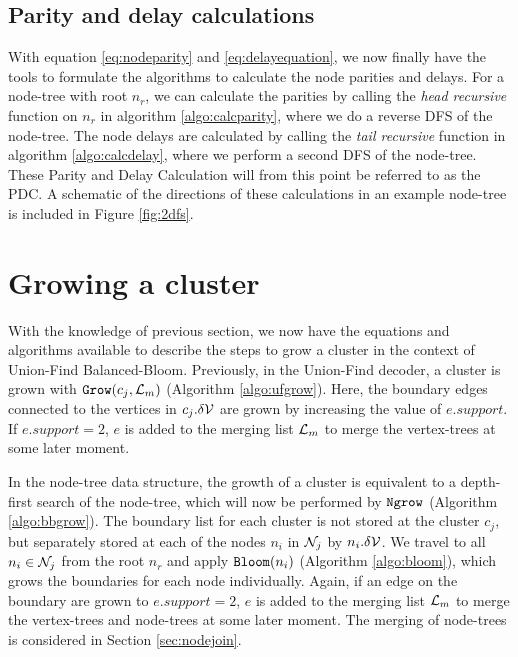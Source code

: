 \subsection{Parity and delay calculations}\label{sec:pdccalc}

With equation \eqref{eq:nodeparity} and \eqref{eq:delayequation}, we now finally have the tools to formulate the algorithms to calculate the node parities and delays. For a node-tree with root $n_r$, we can calculate the parities by calling the \emph{head recursive} function  on $n_r$ in algorithm \ref{algo:calcparity}, where we do a reverse DFS of the node-tree. The node delays are calculated by calling the \emph{tail recursive} function  in algorithm \ref{algo:calcdelay}, where we perform a second DFS of the node-tree. These Parity and Delay Calculation will from this point be referred to as the PDC. A schematic of the directions of these calculations in an example node-tree is included in Figure \ref{fig:2dfs}.





\section{Growing a cluster}\label{sec:growingcluster}
With the knowledge of previous section, we now have the equations and algorithms available to describe the steps to grow a cluster in the context of Union-Find Balanced-Bloom. Previously, in the Union-Find decoder, a cluster is grown with $\texttt{Grow}(c_j, \mathcal{L}_m)$ (Algorithm \ref{algo:ufgrow}). Here, the boundary edges connected to the vertices in $c_j.\delta\mathcal{V}$ are grown by increasing the value of $e.support$. If $e.support = 2$, $e$ is added to the merging list $\mathcal{L}_m$ to merge the vertex-trees at some later moment. 

In the node-tree data structure, the growth of a cluster is equivalent to a depth-first search of the node-tree, which will now be performed by $\texttt{Ngrow}$ (Algorithm \ref{algo:bbgrow}). The boundary list for each cluster is not stored at the cluster $c_j$, but separately stored at each of the nodes $n_i$ in $\mathcal{N}_j$ by $n_i.\delta\mathcal{V}$. We travel to all $n_i \in \mathcal{N}_j$ from the root $n_r$ and apply $\texttt{Bloom}(n_i)$ (Algorithm \ref{algo:bloom}), which grows the boundaries for each node individually. Again, if an edge on the boundary are grown to $e.support = 2$, $e$ is added to the merging list $\mathcal{L}_m$ to merge the vertex-trees and node-trees at some later moment. The merging of node-trees is considered in Section \ref{sec:nodejoin}. 

